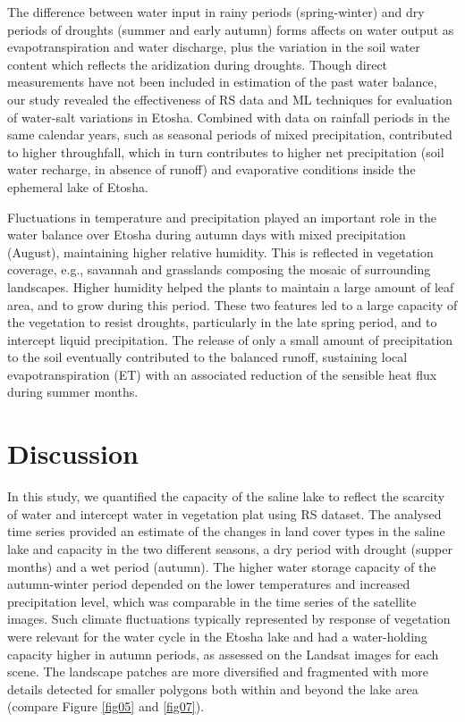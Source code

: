 \documentclass[climate,article,submit,pdftex,moreauthors]{Definitions/mdpi}
\begin{document}
{The difference between water input in rainy periods (spring-winter) and dry periods of droughts (summer and early autumn) forms affects on water output as evapotranspiration and water discharge, plus the variation in the soil water content which reflects the aridization during droughts. Though direct measurements have not been included in estimation of the past water balance, our study revealed the effectiveness of RS data and ML techniques for evaluation of water-salt variations in Etosha. Combined with data on rainfall periods in the same calendar years, such as seasonal periods of mixed precipitation, contributed to higher throughfall, which in turn contributes to higher net precipitation (soil water recharge, in absence of runoff) and evaporative conditions inside the ephemeral lake of Etosha.} 

{Fluctuations in temperature and precipitation played an important role in the water balance over Etosha during autumn days with mixed precipitation (August), maintaining higher relative humidity. This is reflected in vegetation coverage, e.g., savannah and grasslands composing the mosaic of surrounding landscapes. Higher humidity helped the plants to maintain a large amount of leaf area, and to grow during this period. These two features led to a large capacity of the vegetation to resist droughts, particularly in the late spring period, and to intercept liquid precipitation. The release of only a small amount of precipitation to the soil eventually contributed to the balanced runoff, sustaining local evapotranspiration (ET) with an associated reduction of the sensible heat flux during summer months.}

\section{Discussion}

{In this study, we quantified the capacity of the saline lake to reflect the scarcity of water} and intercept water in vegetation plat using RS dataset. The analysed time series provided an estimate of the changes in land cover types in the saline lake and capacity in the two different seasons, a dry period with drought (supper months) and a wet period (autumn). The higher water storage capacity of the autumn-winter period depended on the lower temperatures and increased precipitation level, which was comparable in the time series of the satellite images. Such climate fluctuations typically represented by response of vegetation were relevant for the water cycle in the Etosha lake and had a water-holding capacity higher in {autumn} periods, as assessed on the Landsat images for each scene. The landscape patches are more diversified and fragmented with more details detected for smaller polygons both within and beyond the lake area (compare Figure \ref{fig05} and \ref{fig07}). 
\end{document}
